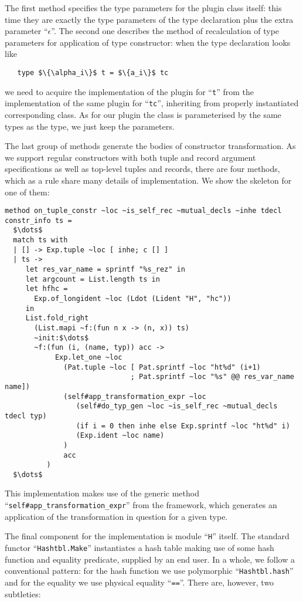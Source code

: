 The first method specifies the type parameters for the plugin class itself: this time they are exactly the type parameters of the type declaration plus
the extra parameter ``$\epsilon$''. The second one describes the method of recalculation of type parameters for application of type constructor: when
the type declaration looks like

\begin{lstlisting}
   type $\{\alpha_i\}$ t = $\{a_i\}$ tc
\end{lstlisting}

we need to acquire the implementation of the plugin for ``\lstinline{t}'' from the implementation of the same plugin for ``\lstinline{tc}'', inheriting
from properly instantiated corresponding class. As for our plugin the class is parameterised by the same types as the type, we just keep the parameters.

The last group of methods generate the bodies of constructor transformation. As we support regular constructors with both tuple and record
argument specifications as well as top-level tuples and records, there are four methods, which as a rule share many details of implementation. We show the
skeleton for one of them:

\begin{lstlisting}
method on_tuple_constr ~loc ~is_self_rec ~mutual_decls ~inhe tdecl constr_info ts =
  $\dots$ 
  match ts with
  | [] -> Exp.tuple ~loc [ inhe; c [] ]
  | ts ->
     let res_var_name = sprintf "%s_rez" in
     let argcount = List.length ts in
     let hfhc =
       Exp.of_longident ~loc (Ldot (Lident "H", "hc"))
     in
     List.fold_right
       (List.mapi ~f:(fun n x -> (n, x)) ts)
       ~init:$\dots$
       ~f:(fun (i, (name, typ)) acc ->
            Exp.let_one ~loc
              (Pat.tuple ~loc [ Pat.sprintf ~loc "ht%d" (i+1)
                              ; Pat.sprintf ~loc "%s" @@ res_var_name name])
              (self#app_transformation_expr ~loc
                 (self#do_typ_gen ~loc ~is_self_rec ~mutual_decls tdecl typ)
                 (if i = 0 then inhe else Exp.sprintf ~loc "ht%d" i)
                 (Exp.ident ~loc name)
              )
              acc
          )
  $\dots$
\end{lstlisting}

This implementation makes use of the generic method ``\lstinline{self#app_transformation_expr}'' from the framework, which generates an application of
the transformation in question for a given type.

The final component for the implementation is module ``\lstinline{H}'' itself. The standard functor ``\lstinline{Hashtbl.Make}'' instantiates a
hash table making use of some hash function and equality predicate, supplied by an end user. In a whole, we follow a conventional pattern:
for the hash function we use polymorphic ``\lstinline{Hashtbl.hash}'' and for the equality we use physical equality ``\lstinline{==}''. There are, however, two
subtleties:

